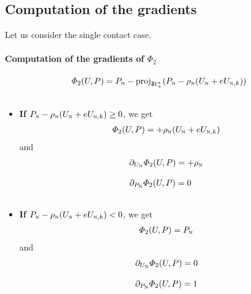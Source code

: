 \subsection{Computation of the gradients}


Let us consider the single contact case.
\paragraph{Computation of the gradients of $\Phi_2$}
\begin{equation}
  \label{eq:AC-T1}
  \begin{array}{l}
  \varPhi_2(U,P) =  P_{{\hbox{\tiny{N}}}} - \operatorname{proj}_{\mathrm{I\!R}^{a}_+} (P_{{\hbox{\tiny{N}}}} - \rho_{{\hbox{\tiny{N}}}} (U_{{\hbox{\tiny{N}}}} +e  U_{{\hbox{\tiny{N}}},k}) ) \\ \\
\end{array}
\end{equation}
\begin{itemize}
\item \textbf{If} $P_{{\hbox{\tiny{N}}}} - \rho_{{\hbox{\tiny{N}}}} (U_{{\hbox{\tiny{N}}}} +e  U_{{\hbox{\tiny{N}}},k}) \geq 0 $, we get 
  \begin{equation}
    \label{eq:AC-T2}
    \begin{array}{l}
      \varPhi_2(U,P) =  + \rho_{{\hbox{\tiny{N}}}} (U_{{\hbox{\tiny{N}}}} +e  U_{{\hbox{\tiny{N}}},k})
    \end{array}
  \end{equation}
  and 
  \begin{equation}
    \label{eq:AC-T3}
    \begin{array}{l}
     \partial_{U_{{\hbox{\tiny{N}}}}} \varPhi_2(U,P) =  + \rho_{{\hbox{\tiny{N}}}} \\ \\
     \partial_{P_{{\hbox{\tiny{N}}}}} \varPhi_2(U,P) =  0 \\ \\ 
    \end{array}
  \end{equation}
\item \textbf{If} $P_{{\hbox{\tiny{N}}}} - \rho_{{\hbox{\tiny{N}}}} (U_{{\hbox{\tiny{N}}}} +e  U_{{\hbox{\tiny{N}}},k})  < 0 $, we get 
  \begin{equation}
    \label{eq:AC-T4}
    \begin{array}{l}
      \varPhi_2(U,P) =  P_{{\hbox{\tiny{N}}}}
    \end{array}
  \end{equation}
  and 
  \begin{equation}
    \label{eq:AC-T5}
    \begin{array}{l}
     \partial_{U_{{\hbox{\tiny{N}}}}} \varPhi_2(U,P) =  0 \\ \\
     \partial_{P_{{\hbox{\tiny{N}}}}} \varPhi_2(U,P) =  1 \\ \\ 
    \end{array}
  \end{equation}
\end{itemize}
